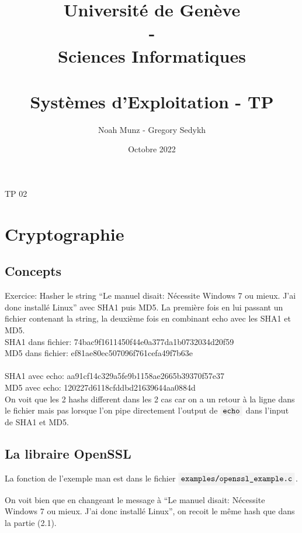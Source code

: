 \documentclass[draft, french]{article}
\title{
   {\huge Université de Genève \\ - \\ Sciences Informatiques} \\
    \vspace{0.6cm}
    \unilogo{0.41} \\ 
    \vspace{1.1cm}
    {\huge Systèmes d'Exploitation - TP \nb}
    \vspace{0.1cm}
}
\author{Noah Munz - Gregory Sedykh}
\date{Octobre 2022}
\newcommand{\code}[1]{$\mbox{\colorbox{light-gray}{\texttt{#1}}}$}
\newcommand{\quo}[1]{``{#1}''}
\newcommand{\nb}{02}
\begin{document}
%
\maketitle
\thispagestyle{empty}
\clearpage
\setcounter{page}{1}
%
%
\begin{center}
{\huge TP \nb}
\end{center}
\vspace{0.2cm}
%
\section{Cryptographie}
%
\vspace{0.3cm}
\subsection{Concepts}
Exercice: Hasher le string \quo{Le manuel disait: Nécessite Windows 7 ou mieux. J'ai donc installé Linux} avec SHA1 puis MD5.
La première fois en lui passant un fichier contenant la string, la deuxième fois en combinant echo avec les SHA1 et MD5.\\


SHA1 dans fichier: 74bac9f1611450f44e0a377da1b0732034d20f59\\
MD5 dans fichier: ef81ae80ec507096f761cefa49f7b63e
\\
\\SHA1 avec echo: aa91cf14c329a5fe9b1158ae2665b39370f57e37
\\MD5 avec echo: 120227d6118cfddbd21639644aa0884d\\

On voit que les 2 hashs different dans les 2 cas car on a un retour à la ligne dans le fichier mais pas lorsque l'on pipe directement l'output de \code{echo} dans l'input de SHA1 et MD5.

%
\vspace{0.3cm}
\subsection{La libraire OpenSSL}

La fonction de l'exemple man est dans le fichier \code{examples/openssl\_example.c}.

On voit bien que en changeant le message à \quo{Le manuel disait: Nécessite Windows 7 ou mieux. J'ai donc installé Linux}, on recoit le même hash que dans la partie (2.1).
%

%
%
\vspace{0.3cm}
\end{document}

